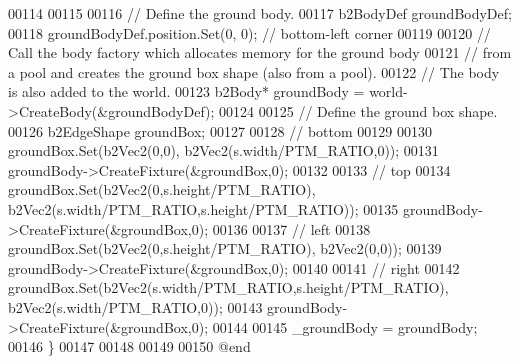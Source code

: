 \begin{DoxyCode}
00114     
00115     
00116     \textcolor{comment}{// Define the ground body.}
00117     b2BodyDef groundBodyDef;
00118     groundBodyDef.position.Set(0, 0); \textcolor{comment}{// bottom-left corner}
00119     
00120     \textcolor{comment}{// Call the body factory which allocates memory for the ground body}
00121     \textcolor{comment}{// from a pool and creates the ground box shape (also from a pool).}
00122     \textcolor{comment}{// The body is also added to the world.}
00123     b2Body* groundBody = world->CreateBody(&groundBodyDef);
00124     
00125     \textcolor{comment}{// Define the ground box shape.}
00126     b2EdgeShape groundBox;
00127     
00128     \textcolor{comment}{// bottom}
00129     
00130     groundBox.Set(b2Vec2(0,0), b2Vec2(s.width/PTM\_RATIO,0));
00131     groundBody->CreateFixture(&groundBox,0);
00132     
00133     \textcolor{comment}{// top}
00134     groundBox.Set(b2Vec2(0,s.height/PTM\_RATIO), b2Vec2(s.width/PTM\_RATIO,s.height/PTM\_RATIO));
00135     groundBody->CreateFixture(&groundBox,0);
00136     
00137     \textcolor{comment}{// left}
00138     groundBox.Set(b2Vec2(0,s.height/PTM\_RATIO), b2Vec2(0,0));
00139     groundBody->CreateFixture(&groundBox,0);
00140     
00141     \textcolor{comment}{// right}
00142     groundBox.Set(b2Vec2(s.width/PTM\_RATIO,s.height/PTM\_RATIO), b2Vec2(s.width/PTM\_RATIO,0));
00143     groundBody->CreateFixture(&groundBox,0);
00144     
00145     \_groundBody = groundBody;
00146 \}
00147 
00148 
00149 
00150 \textcolor{keyword}{@end}
\end{DoxyCode}

